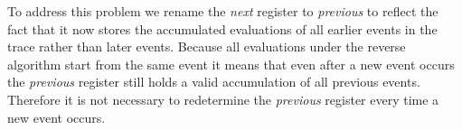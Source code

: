 
To address this problem we rename the \textit{next} register to \textit{previous} to reflect the fact that it now stores the accumulated evaluations of all earlier events in the trace rather than later events.  Because all evaluations under the reverse algorithm start from the same event it means that even after a new event occurs the \textit{previous} register still holds a valid accumulation of all previous events.  Therefore it is not necessary to redetermine the \textit{previous} register every time a new event occurs.


